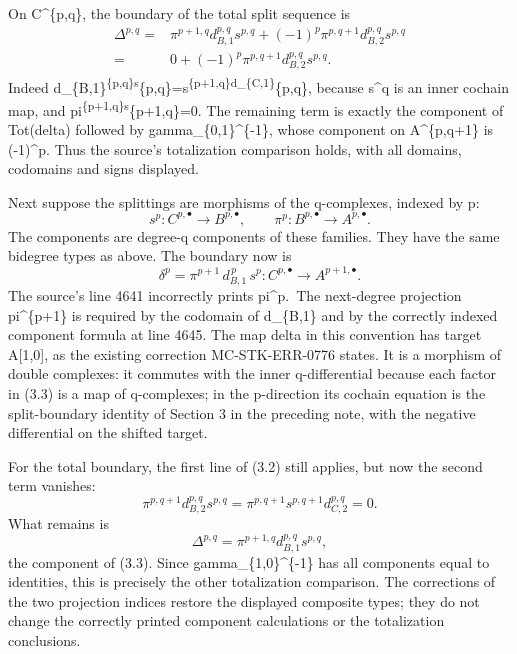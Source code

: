 On C\^{}\{p,q\}, the boundary of the total split sequence is \[
\begin{aligned}
\Delta^{p,q}
={}&\pi^{p+1,q}d_{B,1}^{p,q}s^{p,q}
 +(-1)^p\pi^{p,q+1}d_{B,2}^{p,q}s^{p,q}\\
={}&0+(-1)^p\pi^{p,q+1}d_{B,2}^{p,q}s^{p,q}.
\end{aligned}                                               \tag{3.2}
\] Indeed d\_\{B,1\}\textsuperscript{\{p,q\}s}\{p,q\}=s\textsuperscript{\{p+1,q\}d\_\{C,1\}}\{p,q\}, because s\^{}q is an inner cochain map, and pi\textsuperscript{\{p+1,q\}s}\{p+1,q\}=0. The remaining term is exactly the component of Tot(delta) followed by gamma\_\{0,1\}\^{}\{-1\}, whose component on A\^{}\{p,q+1\} is (-1)\^{}p. Thus the source's totalization comparison holds, with all domains, codomains and signs displayed.

Next suppose the splittings are morphisms of the q-complexes, indexed by p: \[
s^p:C^{p,\bullet}\longrightarrow B^{p,\bullet},\qquad
\pi^p:B^{p,\bullet}\longrightarrow A^{p,\bullet}.
\] The components are degree-q components of these families. They have the same bidegree types as above. The boundary now is \[
\boxed{\quad
\delta^p=\pi^{p+1}\,d_{B,1}^{\,p}\,s^p:
C^{p,\bullet}\longrightarrow A^{p+1,\bullet}.
\quad}                                                     \tag{3.3}
\] The source's line 4641 incorrectly prints pi\^{}p.~The next-degree projection pi\^{}\{p+1\} is required by the codomain of d\_\{B,1\} and by the correctly indexed component formula at line 4645. The map delta in this convention has target A{[}1,0{]}, as the existing correction MC-STK-ERR-0776 states. It is a morphism of double complexes: it commutes with the inner q-differential because each factor in (3.3) is a map of q-complexes; in the p-direction its cochain equation is the split-boundary identity of Section 3 in the preceding note, with the negative differential on the shifted target.

For the total boundary, the first line of (3.2) still applies, but now the second term vanishes: \[
\pi^{p,q+1}d_{B,2}^{p,q}s^{p,q}
=\pi^{p,q+1}s^{p,q+1}d_{C,2}^{p,q}=0.
\] What remains is \[
\Delta^{p,q}=\pi^{p+1,q}d_{B,1}^{p,q}s^{p,q},
\] the component of (3.3). Since gamma\_\{1,0\}\^{}\{-1\} has all components equal to identities, this is precisely the other totalization comparison. The corrections of the two projection indices restore the displayed composite types; they do not change the correctly printed component calculations or the totalization conclusions.

